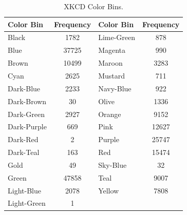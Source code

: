 \begin{table}
  \vspace{-10pt}
  \begin{center}
    \resizebox{0.3\textwidth}{!} {
    \begin{tabular}{@{}lclc@{}}
    \toprule
      Color Bin                        & Frequency                  & Color Bin                       & Frequency \\ \midrule
      \multicolumn{1}{l|}{Black}       & \multicolumn{1}{c||}{1782}  & \multicolumn{1}{l|}{Lime-Green} & 878       \\ \midrule
      \multicolumn{1}{l|}{Blue}        & \multicolumn{1}{c||}{37725} & \multicolumn{1}{l|}{Magenta}    & 990       \\ \midrule
      \multicolumn{1}{l|}{Brown}       & \multicolumn{1}{c||}{10499} & \multicolumn{1}{l|}{Maroon}     & 3283      \\ \midrule
      \multicolumn{1}{l|}{Cyan}        & \multicolumn{1}{c||}{2625}  & \multicolumn{1}{l|}{Mustard}    & 711       \\ \midrule
      \multicolumn{1}{l|}{Dark-Blue}   & \multicolumn{1}{c||}{2233}  & \multicolumn{1}{l|}{Navy-Blue}  & 922       \\ \midrule
      \multicolumn{1}{l|}{Dark-Brown}  & \multicolumn{1}{c||}{30}    & \multicolumn{1}{l|}{Olive}      & 1336      \\ \midrule
      \multicolumn{1}{l|}{Dark-Green}  & \multicolumn{1}{c||}{2927}  & \multicolumn{1}{l|}{Orange}     & 9152      \\ \midrule
      \multicolumn{1}{l|}{Dark-Purple} & \multicolumn{1}{c||}{669}   & \multicolumn{1}{l|}{Pink}       & 12627     \\ \midrule
      \multicolumn{1}{l|}{Dark-Red}    & \multicolumn{1}{c||}{2}     & \multicolumn{1}{l|}{Purple}     & 25747     \\ \midrule
      \multicolumn{1}{l|}{Dark-Teal}   & \multicolumn{1}{c||}{163}   & \multicolumn{1}{l|}{Red}        & 15474     \\ \midrule
      \multicolumn{1}{l|}{Gold}        & \multicolumn{1}{c||}{49}    & \multicolumn{1}{l|}{Sky-Blue}   & 32        \\ \midrule
      \multicolumn{1}{l|}{Green}       & \multicolumn{1}{c||}{47858} & \multicolumn{1}{l|}{Teal}       & 9007      \\ \midrule
      \multicolumn{1}{l|}{Light-Blue}  & \multicolumn{1}{c||}{2078}  & \multicolumn{1}{l|}{Yellow}     & 7808      \\ \midrule
      \multicolumn{1}{l|}{Light-Green} & \multicolumn{1}{c|}{1}     & \multicolumn{2}{l}{}                        \\ \cmidrule(r){1-2}
    \end{tabular}}
  \end{center}
  \vspace{-15pt}
  \caption[XKCD Color Survey: Color Bins]{XKCD Color Bins.}
  \label{table:colorbins}
\end{table}
